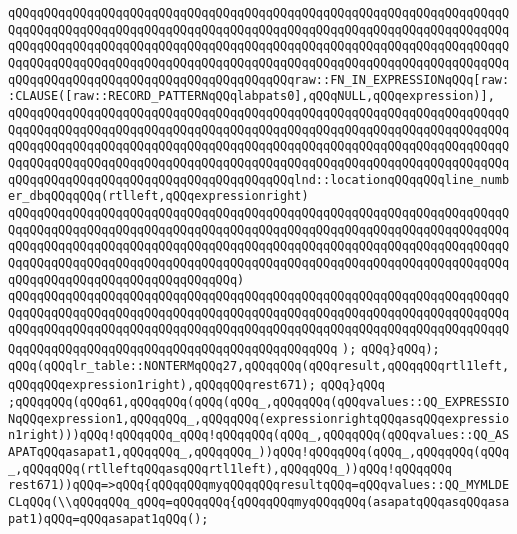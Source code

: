 \verb|qQQqqQQqqQQqqQQqqQQqqQQqqQQqqQQqqQQqqQQqqQQqqQQqqQQqqQQqqQQqqQQqqQQqqQQqqQQqqQQqqQQqqQQqqQQqqQQqqQQqqQQqqQQqqQQqqQQqqQQqqQQqqQQqqQQqqQQqqQQqqQQqqQQqqQQqqQQqqQQqqQQqqQQqqQQqqQQqqQQqqQQqqQQqqQQqqQQqqQQqqQQqqQQqqQQqqQQqqQQqqQQqqQQqqQQqqQQqqQQqqQQqqQQqqQQqqQQqqQQqqQQqqQQqqQQqqQQqqQQqqQQqqQQqqQQqqQQqqQQqqQQqqQQqqQQqqQQqqQQqraw::FN_IN_EXPRESSIONqQQq[raw::CLAUSE([raw::RECORD_PATTERNqQQqlabpats0],qQQqNULL,qQQqexpression)],|\newline
\verb|qQQqqQQqqQQqqQQqqQQqqQQqqQQqqQQqqQQqqQQqqQQqqQQqqQQqqQQqqQQqqQQqqQQqqQQqqQQqqQQqqQQqqQQqqQQqqQQqqQQqqQQqqQQqqQQqqQQqqQQqqQQqqQQqqQQqqQQqqQQqqQQqqQQqqQQqqQQqqQQqqQQqqQQqqQQqqQQqqQQqqQQqqQQqqQQqqQQqqQQqqQQqqQQqqQQqqQQqqQQqqQQqqQQqqQQqqQQqqQQqqQQqqQQqqQQqqQQqqQQqqQQqqQQqqQQqqQQqqQQqqQQqqQQqqQQqqQQqqQQqqQQqqQQqqQQqqQQqqQQqlnd::locationqQQqqQQqline_number_dbqQQqqQQq(rtlleft,qQQqexpressionright)|\newline
\verb|qQQqqQQqqQQqqQQqqQQqqQQqqQQqqQQqqQQqqQQqqQQqqQQqqQQqqQQqqQQqqQQqqQQqqQQqqQQqqQQqqQQqqQQqqQQqqQQqqQQqqQQqqQQqqQQqqQQqqQQqqQQqqQQqqQQqqQQqqQQqqQQqqQQqqQQqqQQqqQQqqQQqqQQqqQQqqQQqqQQqqQQqqQQqqQQqqQQqqQQqqQQqqQQqqQQqqQQqqQQqqQQqqQQqqQQqqQQqqQQqqQQqqQQqqQQqqQQqqQQqqQQqqQQqqQQqqQQqqQQqqQQqqQQqqQQqqQQqqQQqqQQqqQQqqQQq)|\newline
\verb|qQQqqQQqqQQqqQQqqQQqqQQqqQQqqQQqqQQqqQQqqQQqqQQqqQQqqQQqqQQqqQQqqQQqqQQqqQQqqQQqqQQqqQQqqQQqqQQqqQQqqQQqqQQqqQQqqQQqqQQqqQQqqQQqqQQqqQQqqQQqqQQqqQQqqQQqqQQqqQQqqQQqqQQqqQQqqQQqqQQqqQQqqQQqqQQqqQQqqQQqqQQqqQQqqQQqqQQqqQQqqQQqqQQqqQQqqQQqqQQqqQQqqQQqqQQqqQQq|\newline
\verb|);|\newline
\verb|qQQq}qQQq);|\newline
\verb|qQQq(qQQqlr_table::NONTERMqQQq27,qQQqqQQq(qQQqresult,qQQqqQQqrtl1left,qQQqqQQqexpression1right),qQQqqQQqrest671);|\newline
\verb|qQQq}qQQq|\newline
\verb|;qQQqqQQq(qQQq61,qQQqqQQq(qQQq(qQQq_,qQQqqQQq(qQQqvalues::QQ_EXPRESSIONqQQqexpression1,qQQqqQQq_,qQQqqQQq(expressionrightqQQqasqQQqexpression1right)))qQQq!qQQqqQQq_qQQq!qQQqqQQq(qQQq_,qQQqqQQq(qQQqvalues::QQ_ASAPATqQQqasapat1,qQQqqQQq_,qQQqqQQq_))qQQq!qQQqqQQq(qQQq_,qQQqqQQq(qQQq_,qQQqqQQq(rtlleftqQQqasqQQqrtl1left),qQQqqQQq_))qQQq!qQQqqQQq|\newline
\verb|rest671))qQQq=>qQQq{qQQqqQQqmyqQQqqQQqresultqQQq=qQQqvalues::QQ_MYMLDECLqQQq(\\qQQqqQQq_qQQq=qQQqqQQq{qQQqqQQqmyqQQqqQQq(asapatqQQqasqQQqasapat1)qQQq=qQQqasapat1qQQq();|\newline
